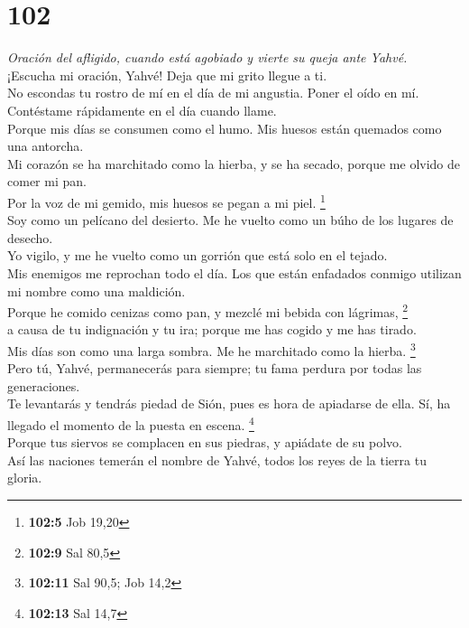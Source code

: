 \hypertarget{section-99}{%
\section{102}\label{section-99}}

\emph{Oración del afligido, cuando está agobiado y vierte su queja ante
Yahvé.}\\
 ¡Escucha mi oración, Yahvé! Deja que mi grito llegue a
ti.\\
 No escondas tu rostro de mí en el día de mi angustia.
Poner el oído en mí. Contéstame rápidamente en el día cuando llame.\\
 Porque mis días se consumen como el humo. Mis huesos
están quemados como una antorcha.\\
 Mi corazón se ha marchitado como la hierba, y se ha
secado, porque me olvido de comer mi pan.\\
 Por la voz de mi gemido, mis huesos se pegan a mi piel.
\footnote{\textbf{102:5} Job 19,20}\\
 Soy como un pelícano del desierto. Me he vuelto como un
búho de los lugares de desecho.\\
 Yo vigilo, y me he vuelto como un gorrión que está solo
en el tejado.\\
 Mis enemigos me reprochan todo el día. Los que están
enfadados conmigo utilizan mi nombre como una maldición.\\
 Porque he comido cenizas como pan, y mezclé mi bebida con
lágrimas, \footnote{\textbf{102:9} Sal 80,5}\\
 a causa de tu indignación y tu ira; porque me has cogido
y me has tirado.\\
 Mis días son como una larga sombra. Me he marchitado
como la hierba. \footnote{\textbf{102:11} Sal 90,5; Job 14,2}\\
 Pero tú, Yahvé, permanecerás para siempre; tu fama
perdura por todas las generaciones.\\
 Te levantarás y tendrás piedad de Sión, pues es hora de
apiadarse de ella. Sí, ha llegado el momento de la puesta en escena.
\footnote{\textbf{102:13} Sal 14,7}\\
 Porque tus siervos se complacen en sus piedras, y
apiádate de su polvo.\\
 Así las naciones temerán el nombre de Yahvé, todos los
reyes de la tierra tu gloria.\\
